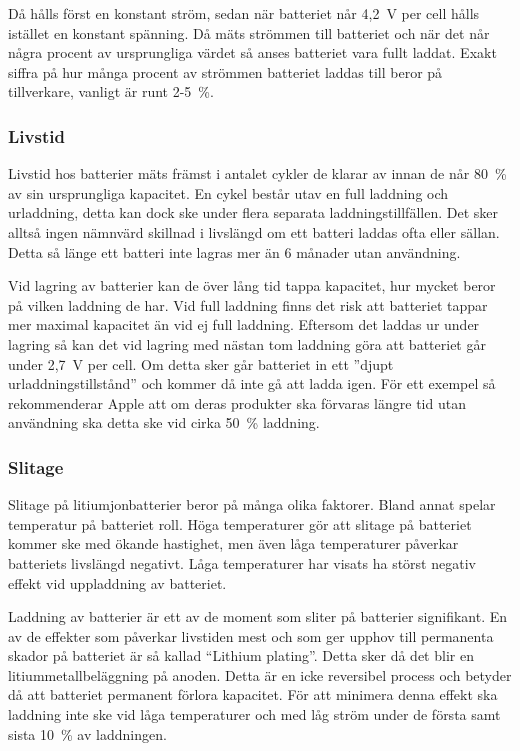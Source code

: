 \documentclass[a4paper,12pt]{article}
\begin{document}
Då hålls först en konstant ström, sedan när batteriet når 4,2~V per cell hålls istället en konstant spänning. Då mäts strömmen till batteriet och när det når några procent av ursprungliga värdet så anses batteriet vara fullt laddat. Exakt siffra på hur många procent av strömmen batteriet laddas till beror på tillverkare, vanligt är runt 2-5~\%.

\subsubsection{Livstid}
Livstid hos batterier mäts främst i antalet cykler de klarar av innan de når 80~\% av sin ursprungliga kapacitet. En cykel består utav en full laddning och urladdning, detta kan dock ske under flera separata laddningstillfällen. Det sker alltså ingen nämnvärd skillnad i livslängd om ett batteri laddas ofta eller sällan. Detta så länge ett batteri inte lagras mer än 6 månader utan användning.

Vid lagring av batterier kan de över lång tid tappa kapacitet, hur mycket beror på vilken laddning de har. Vid full laddning finns det risk att batteriet tappar mer maximal kapacitet än vid ej full laddning. Eftersom det laddas ur under lagring så kan det vid lagring med nästan tom laddning göra att batteriet går under 2,7~V per cell. Om detta sker går batteriet in ett ''djupt urladdningstillstånd'' och kommer då inte gå att ladda igen. För ett exempel så rekommenderar Apple att om deras produkter ska förvaras längre tid utan användning ska detta ske vid cirka 50~\% laddning. \cite{apple}

\subsubsection{Slitage}
Slitage på litiumjonbatterier beror på många olika faktorer. Bland annat spelar temperatur på batteriet roll. Höga temperaturer gör att slitage på batteriet kommer ske med ökande hastighet, men även låga temperaturer påverkar batteriets livslängd negativt. Låga temperaturer har visats ha störst negativ effekt vid uppladdning av batteriet. \cite{ageing}

Laddning av batterier är ett av de moment som sliter på batterier signifikant. En av de effekter som påverkar livstiden mest \cite{charging} och som ger upphov till permanenta skador på batteriet är så kallad “Lithium plating”. Detta sker då det blir en litiummetallbeläggning på anoden.\cite{nasa} Detta är en icke reversibel process och betyder då att batteriet permanent förlora kapacitet. För att minimera denna effekt ska laddning inte ske vid låga temperaturer och med låg ström under de första samt sista 10~\% av laddningen. \cite{charging-p}
\end{document}
